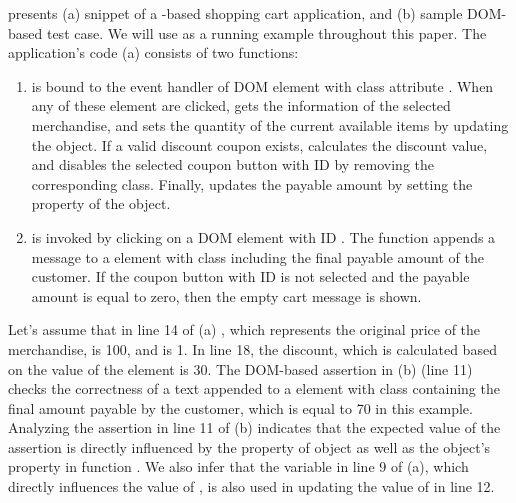  presents (a) snippet of a \javascript-based shopping cart application, and (b) sample DOM-based \selenium test case.  We will use as a running example throughout this paper. The application's code (a) consists of two functions:
\begin{enumerate}

\item {} is bound to the event handler of DOM element with class attribute . When any of these element are clicked,  gets the information of the selected merchandise, and sets the quantity of the current available items by updating the  object. If a valid discount coupon exists,  calculates the discount value, and disables the selected  coupon button with ID  by removing the corresponding class. 
Finally,  updates the payable amount by setting the  property of the  object.

\item {} is invoked by clicking on a DOM element with ID . The function appends a message to a  element with class  including the final payable amount of the customer. If the  coupon button with ID  is not selected and the payable amount is equal to zero, then the empty cart message is shown.    

\end{enumerate}
Let's assume that in line 14 of (a) , which represents the original price of the merchandise, is 100, and  is 1. In line 18, the discount, which is calculated based on the  value of the  element is 30. 
The DOM-based assertion in (b) (line 11) checks the correctness of a text appended to a  element with class  containing the final amount payable by the customer, which is equal to 70 in this example.
Analyzing the assertion in line 11 of (b) indicates that the expected value of the assertion is directly influenced by the  property of  object as well as the object's property  in function . We also infer that the  variable in line 9 of (a), which directly influences the value of , is also used in updating the value of  in line 12.

